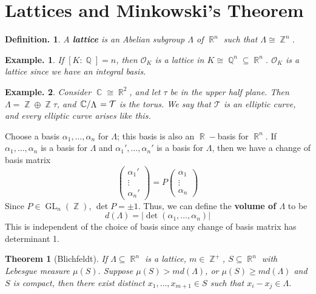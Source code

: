 \documentclass[11pt, a4paper]{memoir}
\DeclareMathOperator{\Q}{{\mathbb{Q}}}
\DeclareMathOperator{\Z}{{\mathbb{Z}}}
\DeclareMathOperator{\R}{{\mathbb{R}}}
\DeclareMathOperator{\C}{{\mathbb{C}}}
\theoremstyle{change}
\newtheorem{theorem}{Theorem}[section]
\theoremstyle{plain}
\theoremstyle{nonumberplain}
\newtheorem{definition}{Definition.}
\newtheorem{example}{Example.}
\DeclareMathOperator{\GL}{GL}
\newcommand{\quot}[2]{\mathchoice{\left.\raisebox{0.14em}{$#1$}\middle/\raisebox{-0.14em}{$#2$}\right.}
                                 {\left.\raisebox{0.08em}{$#1$}\middle/\raisebox{-0.08em}{$#2$}\right.}
                                 {\left.\raisebox{0.03em}{$#1$}\middle/\raisebox{-0.03em}{$#2$}\right.}
                                 {\left.\raisebox{0em}{$#1$}\middle/\raisebox{0em}{$#2$}\right.}}
\begin{document}
\section{Lattices and Minkowski's Theorem}
\begin{definition}
    A \textbf{lattice} is an Abelian subgroup $\Lambda$ of $\R^n$ such that $\Lambda\cong\Z^n$.
\end{definition}
\begin{example}
    If $[K:\Q]=n$, then $\mathcal{O}_K$ is a lattice in $K\cong\Q^n\subseteq\R^n$.
    $\mathcal{O}_K$ is a lattice since we have an integral basis.
\end{example}
\begin{example}
    Consider $\C\cong\R^2$, and let $\tau$ be in the upper half plane.
    Then $\Lambda=\Z\oplus\Z\tau$, and $\quot{\C}{\Lambda}=\mathcal{T}$ is the torus.
    We say that $\mathcal{T}$ is an elliptic curve, and every elliptic curve arises like this.
\end{example}
Choose a basis $\alpha_1,\ldots,\alpha_n$ for $\Lambda$; this basis is also an $\R-$basis for $\R^n$.
If $\alpha_1,\ldots,\alpha_n$ is a basis for $\Lambda$ and $\alpha_1',\ldots,\alpha_n'$ is a basis for $\Lambda$, then we have a change of basis matrix
\begin{equation*}
    \begin{pmatrix}\alpha_1'\\\vdots\\\alpha_n'\end{pmatrix}=P\begin{pmatrix}\alpha_1\\\vdots\\\alpha_n\end{pmatrix}
\end{equation*}
Since $P\in\GL_n(\Z)$, $\det P=\pm 1$.
Thus, we can define the \textbf{volume of $\Lambda$} to be
\begin{equation*}
    d(\Lambda)=|\det(\alpha_1,\ldots,\alpha_n)|
\end{equation*}
This is independent of the choice of basis since any change of basis matrix has determinant 1.
\begin{theorem}[Blichfeldt]
    If $\Lambda\subseteq\R^n$ is a lattice, $m\in\Z^+$, $S\subseteq\R^n$ with Lebesgue measure $\mu(S)$.
    Suppose $\mu(S)>md(\Lambda)$, or $\mu(S)\geq md(\Lambda)$ and $S$ is compact, then there exist distinct $x_1,\ldots,x_{m+1}\in S$ such that $x_i-x_j\in\Lambda$.
\end{theorem}
\end{document}
